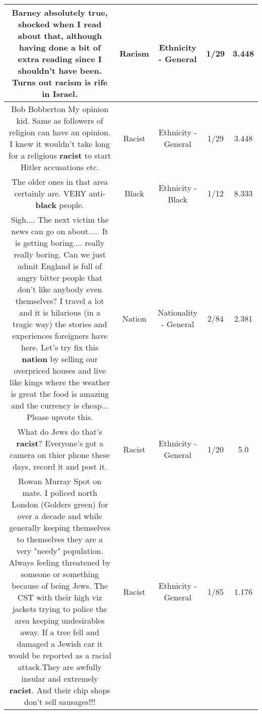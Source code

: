 \documentclass[11pt]{article}
\newlength\mylength
\begin{document}
\begin{center}
\begin{longtable}{|C{.65\mylength}|C{.30\mylength}|C{.12\mylength}|C{.12\mylength}|C{.12\mylength}|}
  \small Barney absolutely true, shocked when I read about that, although having done a bit of extra reading since I shouldn't have been.  Turns out \textbf{racism} is rife in Israel.\normalsize   & Racism & Ethnicity - General & 1/29 & 3.448 \\  \hline
  \small Bob Bobberton My opinion kid. Same as followers of religion can have an opinion. I knew it wouldn't take long for a religious \textbf{racist} to start Hitler accusations etc.\normalsize   & Racist & Ethnicity - General & 1/29 & 3.448 \\  \hline
  \small The older ones in that area certainly are. VERY anti- \textbf{black} people.\normalsize   & Black & Ethnicity - Black & 1/12 & 8.333 \\  \hline
  \small Sigh.... The next victim the news can go on about..... It is getting boring.... really really boring. Can we just admit England is full of angry bitter people that don't like anybody even themselves? I travel a lot and it is hilarious (in a tragic way) the stories and experiences foreigners have here. Let's try fix this \textbf{nation} by selling our overpriced houses and live like kings where the weather is great the food is amazing and the currency is cheap... Please upvote this.\normalsize   & Nation & Nationality - General & 2/84 & 2.381 \\  \hline
  \small What do Jews do that's \textbf{racist}? Everyone's got a camera on thier phone these days, record it and post it.\normalsize   & Racist & Ethnicity - General & 1/20 & 5.0 \\  \hline
  \small Rowan Murray Spot on mate. I policed north London (Golders green) for over a decade and while generally keeping themselves to themselves they are a very "needy" population. Always feeling threatened by someone or something because of being Jews. The CST with their high viz jackets trying to police the area keeping undesirables away. If a tree fell and damaged a Jewish car it would be reported as a racial attack.They are awfully insular and extremely \textbf{racist}. And their chip shops don't sell sausages!!!\normalsize   & Racist & Ethnicity - General & 1/85 & 1.176 \\  \hline

\end{longtable}
\end{center}
\end{document}
